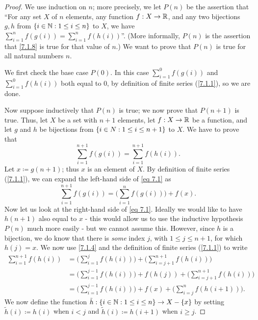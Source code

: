 \begin{proof}
  We use induction on \(n\);
  more precisely, we let \(P(n)\) be the assertion that ``For any set \(X\) of \(n\) elements, any function \(f : X \to \mathbb{R}\), and any two bijections \(g, h\) from \(\left\lbrace i \in \mathbb{N} : 1 \leq i \leq n\right\rbrace\) to \(X\), we have \(\sum_{i = 1}^n f(g(i)) = \sum_{i = 1}^n f(h(i))\)''.
  (More informally, \(P(n)\) is the assertion that \cref{7.1.8} is true for that value of \(n\).)
  We want to prove that \(P(n)\) is true for all natural numbers \(n\).

  We first check the base case \(P(0)\).
  In this case \(\sum_{i = 1}^0 f(g(i))\) and \(\sum_{i = 1}^0 f(h(i))\) both equal to \(0\), by definition of finite series (\cref{7.1.1}), so we are done.

  Now suppose inductively that \(P(n)\) is true;
  we now prove that \(P(n + 1)\) is true.
  Thus, let \(X\) be a set with \(n + 1\) elements, let \(f : X \to \mathbb{R}\) be a function, and let \(g\) and \(h\) be bijections from \(\left\lbrace i \in N : 1 \leq i \leq n + 1\right\rbrace\) to \(X\).
  We have to prove that
  \[
    \sum_{i = 1}^{n + 1} f(g(i)) = \sum_{i = 1}^{n + 1} f(h(i)). \tag{7.1}\label{eq 7.1}
  \]
  Let \(x \coloneqq g(n + 1)\);
  thus \(x\) is an element of \(X\).
  By definition of finite series (\cref{7.1.1}), we can expand the left-hand side of \eqref{eq 7.1} as
  \[
    \sum_{i = 1}^{n + 1} f(g(i)) = \Bigg(\sum_{i = 1}^n f(g(i))\Bigg) + f(x).
  \]
  Now let us look at the right-hand side of \eqref{eq 7.1}.
  Ideally we would like to have \(h(n + 1)\) also equal to \(x\)
  - this would allow us to use the inductive hypothesis \(P(n)\) much more easily
  - but we cannot assume this.
  However, since \(h\) is a bijection, we do know that there is \emph{some} index \(j\), with \(1 \leq j \leq n + 1\), for which \(h(j) = x\).
  We now use \cref{7.1.4} and the definition of finite series (\cref{7.1.1}) to write
  \begin{align*}
    \sum_{i = 1}^{n + 1} f(h(i)) & = \Bigg(\sum_{i = 1}^j f(h(i))\Bigg) + \Bigg(\sum_{i = j + 1}^{n + 1} f(h(i))\Bigg)                 \\
                                 & = \Bigg(\sum_{i = 1}^{j - 1} f(h(i))\Bigg) + f(h(j)) + \Bigg(\sum_{i = j + 1}^{n + 1} f(h(i))\Bigg) \\
                                 & = \Bigg(\sum_{i = 1}^{j - 1} f(h(i))\Bigg) + f(x) + \Bigg(\sum_{i = j}^n f(h(i + 1))\Bigg).
  \end{align*}
  We now define the function \(\tilde{h} : \left\lbrace i \in \mathbb{N} : 1 \leq i \leq n\right\rbrace \to X - \left\lbrace x\right\rbrace\) by setting \(\tilde{h}(i) \coloneqq h(i)\) when \(i < j\) and \(\tilde{h}(i) \coloneqq h(i + 1)\) when \(i \geq j\).

\end{proof}
